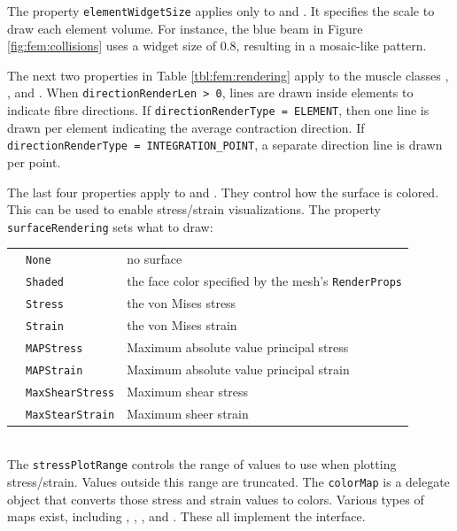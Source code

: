 The property {\tt elementWidgetSize} applies only to 
 and
.  It specifies the scale to
draw each element volume.  For instance, the blue beam in Figure \ref{fig:fem:collisions}
uses a widget size of 0.8, resulting in a mosaic-like pattern.

The next two properties in Table \ref{tbl:fem:rendering} apply to the
muscle classes
, 
, and
\pdfbreak
{}.
When {\tt directionRenderLen > 0}, lines are drawn inside elements to indicate fibre
directions.  If {\tt directionRenderType = ELEMENT}, then one line is drawn per
element indicating the average contraction direction.  If 
{\tt directionRenderType = INTEGRATION\_POINT}, a separate direction line is drawn 
per point.

The last four properties apply to 
 and 
.
They control how the surface is colored.  This can be used to enable stress/strain
visualizations.  The property {\tt surfaceRendering} sets what to draw:\\
\medskip
\begin{tabular}{lll}
& {\tt None} & no surface\\
& {\tt Shaded} & the face color specified by the mesh's {\tt RenderProps}\\
& {\tt Stress} & the von Mises stress\\
& {\tt Strain} & the von Mises strain\\
& {\tt MAPStress} & Maximum absolute value principal stress\\
& {\tt MAPStrain} & Maximum absolute value principal strain\\
& {\tt MaxShearStress} & Maximum shear stress\\
& {\tt MaxStearStrain} & Maximum sheer strain
\end{tabular}
\medskip\\
The {\tt stressPlotRange} controls the range of values to use when plotting 
stress/strain.  Values outside this range are truncated.  The {\tt colorMap}
is a delegate object that converts those stress and strain values to colors.
Various types of maps exist, including 
,
,
, and
.  These all implement the
 interface.


